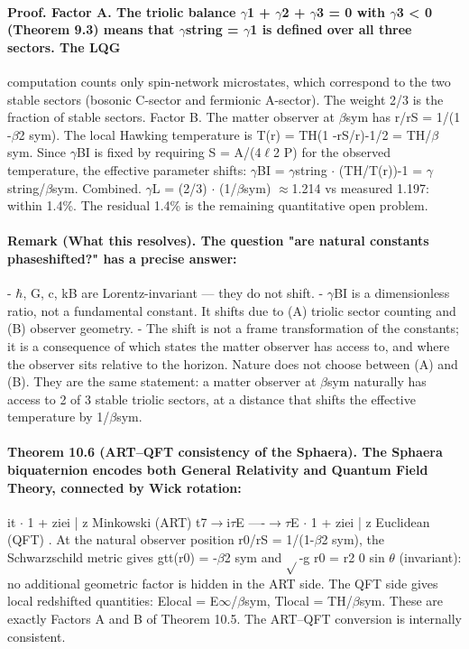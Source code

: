 \paragraph*{Proof. Factor A. The triolic balance $\gamma$1 + $\gamma$2 + $\gamma$3 = 0 with $\gamma$3 < 0 (Theorem 9.3) means that $\gamma$string = $\gamma$1 is defined over all three sectors. The LQG}
computation counts only spin-network microstates, which correspond to the two stable sectors (bosonic C-sector and fermionic A-sector). The weight 2/3 is the fraction of stable sectors. Factor B. The matter observer at $\beta$sym has r/rS = 1/(1 -$\beta$2 sym). The local Hawking temperature is T(r) = TH(1 -rS/r)-1/2 = TH/$\beta$sym. Since $\gamma$BI is fixed by requiring S = A/(4$\ell$2 P) for the observed temperature, the effective parameter shifts: $\gamma$BI = $\gamma$string $\cdot$ (TH/T(r))-1 = $\gamma$string/$\beta$sym. Combined. $\gamma$L = (2/3) $\cdot$ (1/$\beta$sym) $\approx$1.214 vs measured 1.197: within 1.4\%. The residual 1.4\% is the remaining quantitative open problem.
\paragraph*{Remark (What this resolves). The question "are natural constants phaseshifted?" has a precise answer:}
- $\hbar$, G, c, kB are Lorentz-invariant --- they do not shift.
- $\gamma$BI is a dimensionless ratio, not a fundamental constant. It shifts due to
(A) triolic sector counting and (B) observer geometry.
- The shift is not a frame transformation of the constants; it is a consequence of which states the matter observer has access to, and where the
observer sits relative to the horizon. Nature does not choose between (A) and (B). They are the same statement: a matter observer at $\beta$sym naturally has access to 2 of 3 stable triolic sectors, at a distance that shifts the effective temperature by 1/$\beta$sym.
\paragraph*{Theorem 10.6 (ART--QFT consistency of the Sphaera). The Sphaera biquaternion encodes both General Relativity and Quantum Field Theory, connected by Wick rotation:}
it $\cdot$ 1 + ziei | {z } Minkowski (ART) t7$\to$i$\tau$E ----$\to$$\tau$E $\cdot$ 1 + ziei | {z } Euclidean (QFT) . At the natural observer position r0/rS = 1/(1-$\beta$2 sym), the Schwarzschild metric gives gtt(r0) = -$\beta$2 sym and $\sqrt{}$-g
r0 = r2 0 sin $\theta$ (invariant): no additional geometric factor is hidden in the ART side. The QFT side gives local redshifted quantities: Elocal = E$\infty$/$\beta$sym, Tlocal = TH/$\beta$sym. These are exactly Factors A and B of Theorem 10.5. The ART--QFT conversion is internally consistent.

